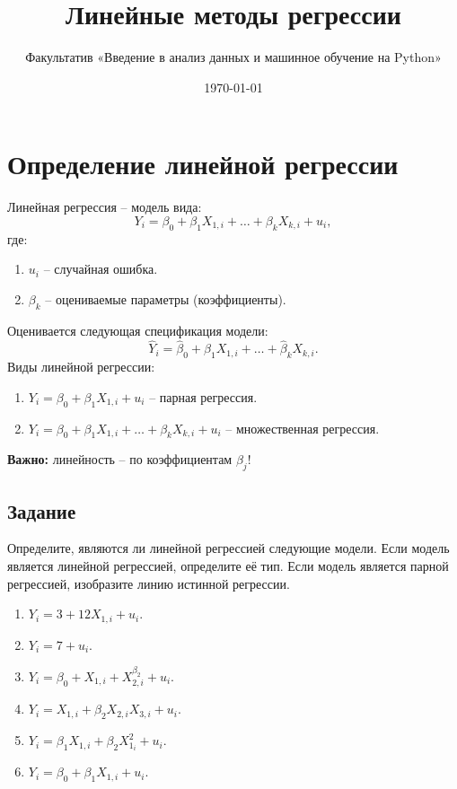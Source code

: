 \documentclass[11pt, a4paper]{extarticle}
\title{Линейные методы регрессии}
\author{Факультатив «Введение в анализ данных и машинное обучение на Python»}
\date{\today}
\begin{document}
	
	\maketitle
	
	\section{Определение линейной регрессии}
	
	Линейная регрессия – модель вида:
	\[
	Y_i = \beta_0 + \beta_1X_{1, i} + \ldots + \beta_kX_{k, i} + u_i,
	\]
	где:
	\begin{enumerate}
		\item $u_i$ – случайная ошибка. 
		\item $\beta_k$ – оцениваемые параметры (коэффициенты). 
	\end{enumerate}

	 Оценивается следующая спецификация модели:
	\[
	\hat{Y}_i = \hat{\beta}_0 + \hat{\beta}_1X_{1, i} + \ldots + \hat{\beta}_kX_{k, i}.
	\]
	Виды линейной регрессии:
	\begin{enumerate}
		\item $Y_i = \beta_0 + \beta_1X_{1, i} + u_i$ – парная регрессия.
		\item $Y_i = \beta_0 + \beta_1X_{1, i} + \ldots + \beta_kX_{k, i} + u_i$ – множественная регрессия. 
	\end{enumerate}

	\textbf{Важно:} линейность – по коэффициентам $\beta_j$!

	\subsection{Задание}
	Определите, являются ли линейной регрессией следующие модели. Если модель является линейной регрессией, определите её тип. Если модель является парной регрессией, изобразите линию истинной регрессии.
	\begin{multicols}{2}
	\begin{enumerate}[label=\alph*)]
		\item $Y_i = 3 + 12X_{1, i} + u_i$.
		\item $Y_i = 7 + u_i$.
		\item $Y_i = \beta_0 + X_{1, i} + X_{2, i}^{\beta_2} + u_i$.
		\item $Y_i = X_{1, i} + \beta_2X_{2, i}X_{3, i} + u_i$.
		\item $Y_i = \beta_1X_{1, i} + \beta_2X_{1_i}^2 + u_i$.
		\item $Y_i = \beta_0 + \beta_1X_{1, i} + u_i$.
	\end{enumerate}
	\end{multicols}
\end{document}
